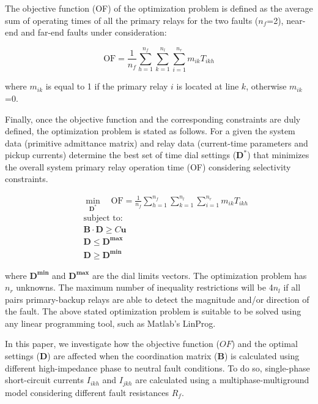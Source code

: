 \documentclass[letterpaper, 10 pt, conference]{IEEEtran}
\begin{document}
The objective function (OF) of the optimization problem is defined as the average sum of operating times of all the
primary relays for the two faults ($n_f$=2), near-end and far-end faults under consideration:

\begin{equation}\label{objective}
  \mbox{OF}=\frac{1}{n_f}\sum_{h=1}^{n_f}\sum_{k=1}^{n_l}\sum_{i=1}^{n_r}m_{ik}  T_{ikh}
\end{equation}


where $m_{ik}$ is equal to 1 if the primary relay $i$ is located at line $k$, otherwise  $m_{ik}$=0.


Finally, once the objective function and the corresponding constraints are duly defined, the optimization problem is stated as follows.
For a given the system data (primitive admittance matrix) and relay data (current-time parameters and pickup currents) determine the best set of time dial settings ($\mathbf{D^*}$) that minimizes the overall system primary relay operation time (OF) considering selectivity constraints. 

\begin{eqnarray}\label{odocr1}
& &  \min_{\mathbf{D^*}} \quad \mbox{OF}=\frac{1}{n_f}\sum_{h=1}^{n_f}\sum_{k=1}^{n_l}\sum_{i=1}^{n_r}m_{ik}  T_{ikh}  \\ \nonumber
& & \mbox{subject to}:\\\label{odocr2}
& &\mathbf{B}\cdot\mathbf{D}\ge C\mathbf{u}\\\label{odocr3}
& &\mathbf{D}\le\mathbf{D^{max}}\\\label{odocr4}
& &\mathbf{D}\ge\mathbf{D^{min}}
\end{eqnarray}

where  $\mathbf{D^{min}}$ and $\mathbf{D^{max}}$ are the dial limits vectors.
The optimization problem has $n_r$ unknowns. The maximum number of inequality restrictions will be 4$n_l$ if all pairs primary-backup relays are able to detect the magnitude and/or direction of the fault.
The above stated optimization problem is suitable to be solved using any linear programming tool, such as Matlab's LinProg.


In this paper, we investigate how the objective function ($OF$) and the optimal settings ($\mathbf{D}$) are affected when the coordination matrix ($\mathbf{B}$) is calculated using different high-impedance phase to neutral fault conditions. To do so, single-phase short-circuit currents $I_{ikh}$ and $I_{jkh}$ are calculated using a multiphase-multiground model considering different fault resistances $R_f$.
\end{document}

